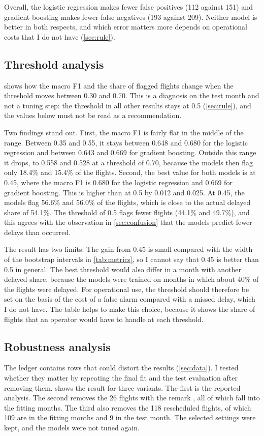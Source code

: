 Overall, the logistic regression makes fewer false positives (112 against 151) and gradient boosting makes fewer false negatives (193 against 209). Neither model is better in both respects, and which error matters more depends on operational costs that I do not have (\cref{sec:rule}).

\subsection{Threshold analysis}\label{sec:threshold}
 shows how the macro F1 and the share of flagged flights change when the threshold moves between 0.30 and 0.70. This is a diagnosis on the test month and not a tuning step: the threshold in all other results stays at 0.5 (\cref{sec:rule}), and the values below must not be read as a recommendation.



Two findings stand out. First, the macro F1 is fairly flat in the middle of the range. Between 0.35 and 0.55, it stays between 0.648 and 0.680 for the logistic regression and between 0.643 and 0.669 for gradient boosting. Outside this range it drops, to 0.558 and 0.528 at a threshold of 0.70, because the models then flag only 18.4\% and 15.4\% of the flights. Second, the best value for both models is at 0.45, where the macro F1 is 0.680 for the logistic regression and 0.669 for gradient boosting. This is higher than at 0.5 by 0.012 and 0.025. At 0.45, the models flag 56.6\% and 56.0\% of the flights, which is close to the actual delayed share of 54.1\%. The threshold of 0.5 flags fewer flights (44.1\% and 49.7\%), and this agrees with the observation in \cref{sec:confusion} that the models predict fewer delays than occurred.

The result has two limits. The gain from 0.45 is small compared with the width of the bootstrap intervals in \cref{tab:metrics}, so I cannot say that 0.45 is better than 0.5 in general. The best threshold would also differ in a month with another delayed share, because the models were trained on months in which about 40\% of the flights were delayed. For operational use, the threshold should therefore be set on the basis of the cost of a false alarm compared with a missed delay, which I do not have. The table helps to make this choice, because it shows the share of flights that an operator would have to handle at each threshold.

\subsection{Robustness analysis}\label{sec:robustness}
The ledger contains rows that could distort the results (\cref{sec:data}). I tested whether they matter by repeating the final fit and the test evaluation after removing them.  shows the result for three variants. The first is the reported analysis. The second removes the 26 flights with the remark , all of which fall into the fitting months. The third also removes the 118 rescheduled flights, of which 109 are in the fitting months and 9 in the test month. The selected settings were kept, and the models were not tuned again.

